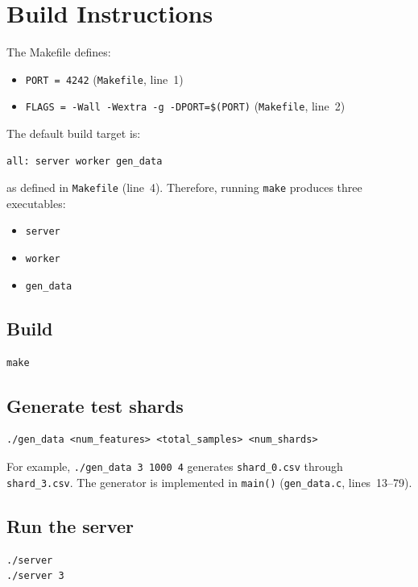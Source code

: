 \documentclass[11pt]{article}
\begin{document}
\section{Build Instructions}

The Makefile defines:
\begin{itemize}
    \item \texttt{PORT = 4242} (\texttt{Makefile}, line~1)
    \item \texttt{FLAGS = -Wall -Wextra -g -DPORT=\$(PORT)} (\texttt{Makefile}, line~2)
\end{itemize}

The default build target is:
\begin{lstlisting}
all: server worker gen_data
\end{lstlisting}
as defined in \texttt{Makefile} (line~4). Therefore, running \texttt{make} produces three executables:
\begin{itemize}
    \item \texttt{server}
    \item \texttt{worker}
    \item \texttt{gen\_data}
\end{itemize}

\subsection*{Build}

\begin{lstlisting}
make
\end{lstlisting}

\subsection*{Generate test shards}

\begin{lstlisting}
./gen_data <num_features> <total_samples> <num_shards>
\end{lstlisting}

For example, \texttt{./gen\_data 3 1000 4} generates \texttt{shard\_0.csv} through \texttt{shard\_3.csv}. The generator is implemented in \texttt{main()} (\texttt{gen\_data.c}, lines~13--79).

\subsection*{Run the server}

\begin{lstlisting}
./server
./server 3
\end{lstlisting}
\end{document}

